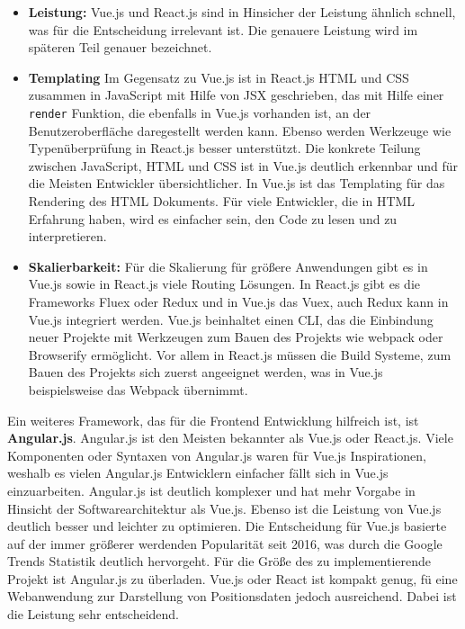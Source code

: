 \begin{itemize}
\item \textbf{Leistung:} Vue.js und React.js sind in Hinsicher der Leistung \"ahnlich schnell, was f\"ur die Entscheidung irrelevant ist. Die genauere Leistung wird im sp\"ateren Teil genauer bezeichnet\cite{VueDokumentationOther2018}.
\item \textbf{Templating} Im Gegensatz zu Vue.js ist in React.js \ac{HTML} und \ac{CSS} zusammen in JavaScript mit Hilfe von JSX geschrieben, das mit Hilfe einer \texttt{render} Funktion, die ebenfalls in Vue.js vorhanden ist, an der Benutzeroberfl\"ache daregestellt werden kann. Ebenso werden Werkzeuge wie Typen\"uberpr\"ufung in React.js besser unterst\"utzt\cite{VueDokumentationOther2018}. Die konkrete Teilung zwischen JavaScript, \ac{HTML} und \ac{CSS} ist in Vue.js deutlich erkennbar und f\"ur die Meisten Entwickler \"ubersichtlicher\cite{Haupt2018}. In Vue.js ist das Templating f\"ur das Rendering des \ac{HTML} Dokuments. F\"ur viele Entwickler, die in \ac{HTML} Erfahrung haben, wird es einfacher sein, den Code zu lesen und zu interpretieren\cite{VueDokumentationOther2018}.
\item \textbf{Skalierbarkeit:} F\"ur die Skalierung f\"ur gr\"o\ss{}ere Anwendungen gibt es in Vue.js sowie in React.js viele Routing L\"osungen. In React.js gibt es die Frameworks Fluex oder Redux und in Vue.js das Vuex, auch Redux kann in Vue.js integriert werden\cite{Peters2017}. Vue.js beinhaltet einen \ac{CLI}, das die Einbindung neuer Projekte mit Werkzeugen zum Bauen des Projekts wie webpack oder Browserify erm\"oglicht.
Vor allem in React.js m\"ussen die Build Systeme, zum Bauen des Projekts sich zuerst angeeignet werden, was in Vue.js beispielsweise das Webpack \"ubernimmt\cite{VueDokumentationOther2018}.
\end{itemize}
Ein weiteres Framework, das f\"ur die Frontend Entwicklung hilfreich ist, ist \textbf{Angular.js}. Angular.js ist den Meisten bekannter als Vue.js oder React.js. Viele Komponenten oder Syntaxen von Angular.js waren f\"ur Vue.js Inspirationen, weshalb es vielen Angular.js Entwicklern einfacher f\"allt sich in Vue.js einzuarbeiten. Angular.js ist deutlich komplexer und hat mehr Vorgabe in Hinsicht der Softwarearchitektur als Vue.js. Ebenso ist die Leistung von Vue.js deutlich besser und leichter zu optimieren. 
Die Entscheidung f\"ur Vue.js basierte auf der immer gr\"o\ss{}erer werdenden Popularit\"at seit 2016, was durch die Google Trends Statistik deutlich hervorgeht\cite{GoogleTrends2018}.  F\"ur die Gr\"o\ss{}e des zu implementierende Projekt ist Angular.js zu \"uberladen. Vue.js oder React ist kompakt genug, f\"u eine Webanwendung zur Darstellung von Positionsdaten jedoch ausreichend. Dabei ist die Leistung sehr entscheidend. \newline
